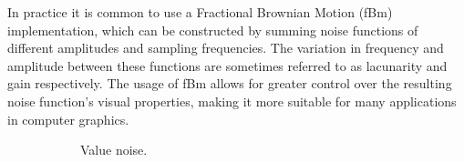 In practice it is common to use a Fractional Brownian Motion (fBm) implementation, which can be constructed by summing noise functions of different amplitudes and sampling frequencies.
The variation in frequency and amplitude between these functions are sometimes referred to as lacunarity and gain respectively.
The usage of fBm allows for greater control over the resulting noise function's visual properties, making it more suitable for many applications in computer graphics.

\begin{figure}[h!]
  \centering
  \begin{subfigure}[b]{0.30\textwidth}
    \caption{Value noise. \cite{value_noise_img}}
  \end{subfigure}
  \quad
  \quad
  \quad
  \begin{subfigure}[b]{0.30\textwidth}

\end{subfigure}
\end{figure}
